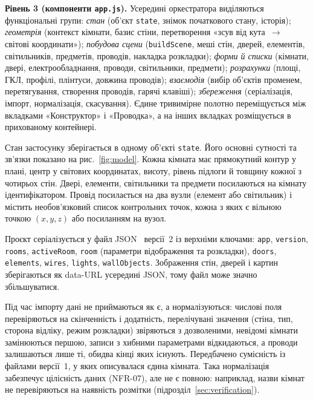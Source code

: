 \textbf{Рівень 3 (компоненти \texttt{app.js}).} Усередині оркестратора виділяються функціональні групи: \emph{стан} (об'єкт \texttt{state}, знімок початкового стану, історія); \emph{геометрія} (контекст кімнати, базис стіни, перетворення «зсув від кута~$\to$ світові координати»); \emph{побудова сцени} (\texttt{buildScene}, меші стін, дверей, елементів, світильників, предметів, проводів, накладка розкладки); \emph{форми й списки} (кімнати, двері, електрообладнання, проводи, світильники, предмети); \emph{розрахунки} (площі, ГКЛ, профілі, плінтуси, довжина проводів); \emph{взаємодія} (вибір об'єктів променем, перетягування, створення проводів, гарячі клавіші); \emph{збереження} (серіалізація, імпорт, нормалізація, скасування). Єдине тривимірне полотно переміщується між вкладками «Конструктор» і «Проводка», а на інших вкладках розміщується в прихованому контейнері.


Стан застосунку зберігається в одному об'єкті \texttt{state}. Його основні сутності та зв'язки показано на рис.~\ref{fig:model}. Кожна кімната має прямокутний контур у плані, центр у світових координатах, висоту, рівень підлоги й товщину кожної з чотирьох стін. Двері, елементи, світильники та предмети посилаються на кімнату ідентифікатором. Провід посилається на два вузли (елемент або світильник) і містить необов'язковий список контрольних точок, кожна з яких є вільною точкою $(x,y,z)$ або посиланням на вузол.


Проєкт серіалізується у файл JSON~ версії~2 із верхніми ключами: \texttt{app}, \texttt{version}, \texttt{rooms}, \texttt{activeRoom}, \texttt{room} (параметри відображення та розкладки), \texttt{doors}, \texttt{elements}, \texttt{wires}, \texttt{lights}, \texttt{wallObjects}. Зображення стін, дверей і картин зберігаються як data-URL усередині JSON, тому файл може значно збільшуватися.

Під час імпорту дані не приймаються як є, а нормалізуються: числові поля перевіряються на скінченність і додатність, перелічувані значення (стіна, тип, сторона відліку, режим розкладки) звіряються з дозволеними, невідомі кімнати замінюються першою, записи з хибними параметрами відкидаються, а проводи залишаються лише ті, обидва кінці яких існують. Передбачено сумісність із файлами версії~1, у яких описувалася єдина кімната. Така нормалізація забезпечує цілісність даних (NFR-07), але не є повною: наприклад, назви кімнат не перевіряються на наявність розмітки (підрозділ~\ref{sec:verification}).

